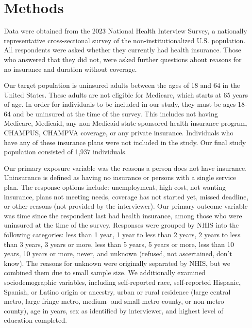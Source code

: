 \documentclass[12pt]{article}
\begin{document}
\newpage
\section{Methods}

Data were obtained from the 2023 National Health Interview Survey, a nationally representative cross-sectional survey of the non-institutionalized U.S. population. All respondents were asked whether they currently had health insurance. Those who answered that they did not, were asked further questions about reasons for no insurance and duration without coverage.

Our target population is uninsured adults between the ages of 18 and 64 in the United States. These adults are not eligible for Medicare, which starts at 65 years of age. In order for individuals to be included in our study, they must be ages 18-64 and be uninsured at the time of the survey. This includes not having Medicare, Medicaid, any non-Medicaid state-sponsored health insurance program, CHAMPUS, CHAMPVA coverage, or any private insurance. Individuals who have any of these insurance plans were not included in the study. Our final study population consisted of 1,937 individuals.

Our primary exposure variable was the reasons a person does not have insurance. Uninsurance is defined as having no insurance or persons with a single service plan. The response options include: unemployment, high cost, not wanting insurance, plans not meeting needs, coverage has not started yet, missed deadline, or other reasons (not provided by the interviewer). Our primary outcome variable was time since the respondent last had health insurance, among those who were uninsured at the time of the survey. Responses were grouped by NHIS into the following categories: less than 1 year, 1 year to less than 2 years, 2 years to less than 3 years, 3 years or more, less than 5 years, 5 years or more, less than 10 years, 10 years or more, never, and unknown (refused, not ascertained, don’t know). The reasons for unknown were originally separated by NHIS, but we combined them due to small sample size. We additionally examined sociodemographic variables, including self-reported race, self-reported Hispanic, Spanish, or Latino origin or ancestry, urban or rural residence (large central metro, large fringe metro, medium- and small-metro county, or non-metro county), age in years, sex as identified by interviewer, and highest level of education completed.
\end{document}
